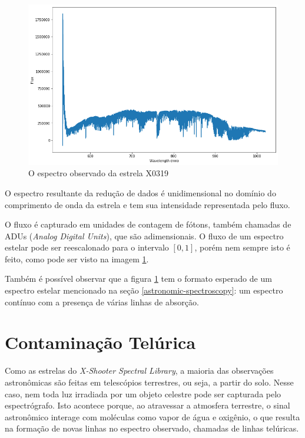 \begin{figure}[htb]
\centering
\includegraphics[width=15cm]{figuras/X0319_obs_spectrum.png}
\caption{O espectro observado da estrela X0319}
\label{fig:x0319-obs-spectrum}
\end{figure}

O espectro resultante da redução de dados é unidimensional no domínio do comprimento de onda da estrela e tem sua intensidade representada pelo fluxo. 

O fluxo é capturado em unidades de contagem de fótons, também chamadas de ADUs (\textit{Analog Digital Units}), que são adimensionais. O fluxo de um espectro estelar pode ser reescalonado para o intervalo $[0, 1]$, porém nem sempre isto é feito, como pode ser visto na imagem \ref{fig:x0319-obs-spectrum}. 

Também é possível observar que a figura \ref{fig:x0319-obs-spectrum} tem o formato esperado de um espectro estelar mencionado na seção \ref{astronomic-spectroscopy}: um espectro contínuo com a presença de várias linhas de absorção.


\section{Contaminação Telúrica} \label{telluric-contamination}

Como as estrelas do \textit{X-Shooter Spectral Library}, a maioria das observações astronômicas são feitas em telescópios terrestres, ou seja, a partir do solo. Nesse caso, nem toda luz irradiada por um objeto celestre pode ser capturada pelo espectrógrafo. Isto acontece porque, ao atravessar a atmosfera terrestre, o sinal astronômico interage com moléculas como vapor de água e oxigênio, o que resulta na formação de novas linhas no espectro observado, chamadas de linhas telúricas. 

